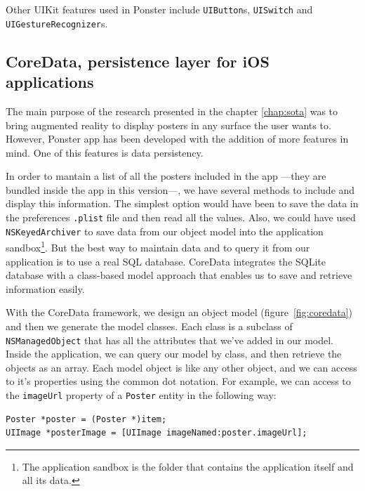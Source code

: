 Other UIKit features used in Ponster include \texttt{UIButton}s, \texttt{UISwitch}
and \texttt{UIGestureRecognizer}s. 

\subsection{CoreData, persistence layer for iOS applications}
The main purpose of the research presented in the chapter \ref{chap:sota} was to
bring augmented reality to display posters in any surface the user wants
to. However, Ponster app has been developed with the addition of more features in
mind. One of this features is data persistency.

In order to mantain a list of all the posters included in the app ---they are bundled
inside the app in this version---, we have several methods to include and display
this information. The simplest option would have been to save the data in the preferences
\texttt{.plist} file and then read all the values. Also, we could have used
\texttt{NSKeyedArchiver} to save data from our object model into the application
sandbox\footnote{The application sandbox is the folder that contains the application
itself and all its data.}. But the best way to maintain data and to
query it from our application is to use a real SQL database. CoreData integrates
the SQLite database with a class-based model approach that enables us to save and
retrieve information easily.

With the CoreData framework, we design an object model (figure~\ref{fig:coredata}) and then we
generate the model classes. Each class is a subclass of \texttt{NSManagedObject}
that has all the attributes that we've added in our model. Inside the application,
we can query our model by class, and then retrieve the objects as an array. Each
model object is like any other object, and we can access to it's properties using
the common dot notation. For example, we can access to the \texttt{imageUrl}
property of a \texttt{Poster} entity in the following way:

\begin{verbatim}
Poster *poster = (Poster *)item;
UIImage *posterImage = [UIImage imageNamed:poster.imageUrl];
\end{verbatim}

